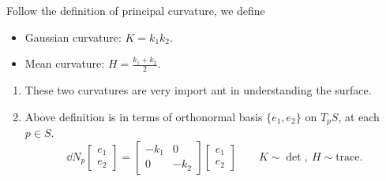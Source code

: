 \begin{definition}
    Follow the definition of principal curvature, we define
    \begin{itemize}
        \item Gaussian curvature: \(K=k_1k_2\).
        \item Mean curvature: \(H=\frac{k_1+k_2}{2}\).
    \end{itemize}
\end{definition}

\begin{remark}
\begin{enumerate}[(1)]
    \item These two curvatures are very import ant in understanding the surface.
    \item Above definition is in terms of orthonormal basis \(\{e_1,e_2\}\) on
        \(T_p S\), at each \(p\in S\). \[
            \dd{N}_p \begin{bmatrix}
                e_1 \\ e_2
            \end{bmatrix}=\begin{bmatrix}
                -k_1 & 0 \\
                0 & -k_2
            \end{bmatrix}\begin{bmatrix}
                e_1 \\ e_2
            \end{bmatrix}
            \qquad
            K \sim \det,\ H \sim\mathrm{trace}
        .\] 
\end{enumerate}
\end{remark}




\newpage

